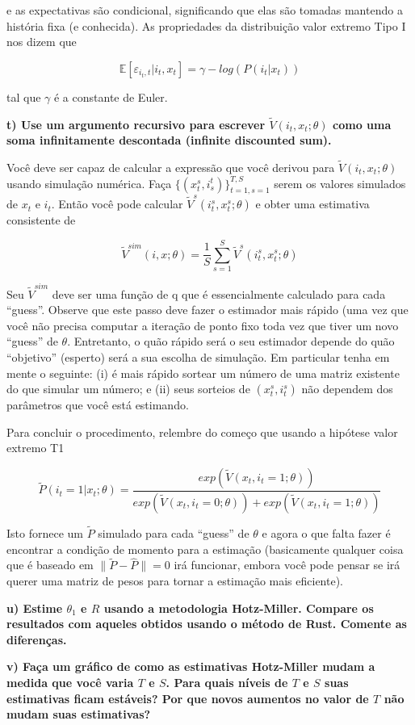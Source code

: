 \documentclass[12pt,a4paper]{article}
\begin{document}
e as expectativas são condicional, significando que elas são tomadas
mantendo a história fixa (e conhecida). As propriedades da distribuição
valor extremo Tipo I nos dizem que

\[
\mathbb{E}[\varepsilon_{i_{t},t}|i_t,x_t] = \gamma - log(P(i_t|x_t))
\]

tal que \(\gamma\) é a constante de Euler.

\textbf{t) Use um argumento recursivo para escrever
\(\tilde{V}(i_t,x_t;\theta)\) como uma soma infinitamente descontada
(infinite discounted sum).}

Você deve ser capaz de calcular a expressão que você derivou para
\(\tilde{V}(i_t,x_t;\theta)\) usando simulação numérica. Faça
\(\{(x_t^s,i_s^t)\}_{t=1,s=1}^{T,S}\) serem os valores simulados de
\(x_t\) e \(i_t\). Então você pode calcular
\(\tilde{V}^s(i_t^s,x_t^s;\theta)\) e obter uma estimativa consistente
de

\[
\tilde{V}^{sim}(i,x;\theta)=\frac{1}{S}\sum_{s=1}^S \tilde{V}^s(i_t^s,x_t^s;\theta)
\]

Seu \(\tilde{V}^{sim}\) deve ser uma função de q que é essencialmente
calculado para cada ``guess''. Observe que este passo deve fazer o
estimador mais rápido (uma vez que você não precisa computar a iteração
de ponto fixo toda vez que tiver um novo ``guess'' de \(\theta\).
Entretanto, o quão rápido será o seu estimador depende do quão
``objetivo'' (esperto) será a sua escolha de simulação. Em particular
tenha em mente o seguinte: (i) é mais rápido sortear um número de uma
matriz existente do que simular um número; e (ii) seus sorteios de
\((x_t^s , i_t^s )\) não dependem dos parâmetros que você está
estimando.

Para concluir o procedimento, relembre do começo que usando a hipótese
valor extremo T1

\[
\tilde{P}(i_t=1|x_t;\theta)=\frac{exp(\tilde{V}(x_t,i_t=1;\theta))}{exp(\tilde{V}(x_t,i_t=0;\theta))+exp(\tilde{V}(x_t,i_t=1;\theta))}
\]

Isto fornece um \(\tilde{P}\) simulado para cada ``guess'' de \(\theta\)
e agora o que falta fazer é encontrar a condição de momento para a
estimação (basicamente qualquer coisa que é baseado em
\(\| \tilde{P} - \hat{P} \| = 0\) irá funcionar, embora você pode pensar
se irá querer uma matriz de pesos para tornar a estimação mais
eficiente).

\textbf{u) Estime \(\theta_1\) e \(R\) usando a metodologia Hotz-Miller.
Compare os resultados com aqueles obtidos usando o método de Rust.
Comente as diferenças.}

\textbf{v) Faça um gráfico de como as estimativas Hotz-Miller mudam a
medida que você varia \(T\) e \(S\). Para quais níveis de \(T\) e \(S\)
suas estimativas ficam estáveis? Por que novos aumentos no valor de
\(T\) não mudam suas estimativas?}
\end{document}
